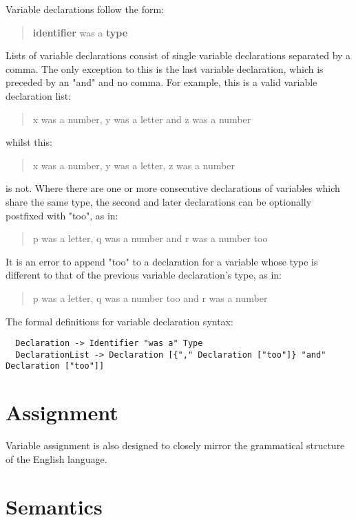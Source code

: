 \documentclass[a4wide, 11pt]{article}
\begin{document}
Variable declarations follow the form:

\begin{quote}
\textbf{identifier} was a \textbf{type}
\end{quote}

Lists of variable declarations consist of single variable declarations separated by a comma. The only exception to this is the last variable declaration, which is preceded by an "and" and no comma. For example, this is a valid variable declaration list:

\begin{quote}
x was a number, y was a letter and z was a number
\end{quote}

whilst this:

\begin{quote}
x was a number, y was a letter, z was a number
\end{quote}

is not. Where there are one or more consecutive declarations of variables which share the same type, the second and later declarations can be optionally postfixed with "too", as in:

\begin{quote}
p was a letter, q was a number and r was a number too
\end{quote}

It is an error to append "too" to a declaration for a variable whose type is different to that of the previous variable declaration's type, as in:

\begin{quote}
p was a letter, q was a number too and r was a number
\end{quote}

The formal definitions for variable declaration syntax:

\begin{verbatim}
  Declaration -> Identifier "was a" Type
  DeclarationList -> Declaration [{"," Declaration ["too"]} "and" Declaration ["too"]]
\end{verbatim}

\section{Assignment}

Variable assignment is also designed to closely mirror the grammatical structure of the English language.

\section{Semantics}
\end{document}
